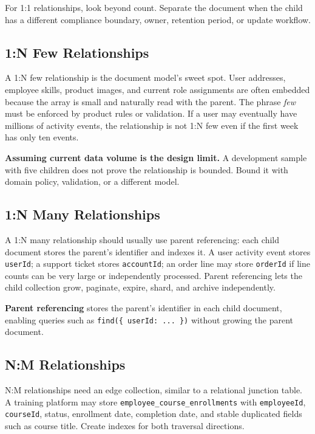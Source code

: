 \begin{tipbox}
For 1:1 relationships, look beyond count. Separate the document when the child has a different compliance boundary, owner, retention period, or update workflow.
\end{tipbox}

\subsection{1:N Few Relationships}
A 1:N few relationship is the document model's sweet spot. User addresses, employee skills, product images, and current role assignments are often embedded because the array is small and naturally read with the parent. The phrase \emph{few} must be enforced by product rules or validation. If a user may eventually have millions of activity events, the relationship is not 1:N few even if the first week has only ten events.

\begin{pitfall}
\textbf{Assuming current data volume is the design limit.} A development sample with five children does not prove the relationship is bounded. Bound it with domain policy, validation, or a different model.
\end{pitfall}

\subsection{1:N Many Relationships}
A 1:N many relationship should usually use parent referencing: each child document stores the parent's identifier and indexes it. A user activity event stores \texttt{userId}; a support ticket stores \texttt{accountId}; an order line may store \texttt{orderId} if line counts can be very large or independently processed. Parent referencing lets the child collection grow, paginate, expire, shard, and archive independently.

\begin{definitionbox}
\textbf{Parent referencing} stores the parent's identifier in each child document, enabling queries such as \texttt{find(\{ userId: ... \})} without growing the parent document.
\end{definitionbox}

\subsection{N:M Relationships}
N:M relationships need an edge collection, similar to a relational junction table. A training platform may store \texttt{employee\_course\_enrollments} with \texttt{employeeId}, \texttt{courseId}, status, enrollment date, completion date, and stable duplicated fields such as course title. Create indexes for both traversal directions.

